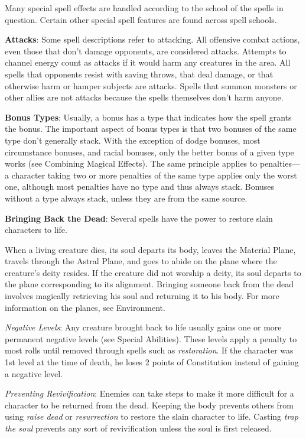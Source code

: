 				
Many special spell effects are handled according to the school of the spells in question. Certain other special spell features are found across spell schools.
				
\textbf{Attacks}: Some spell descriptions refer to attacking. All offensive combat actions, even those that don't damage opponents, are considered attacks. Attempts to channel energy count as attacks if it would harm any creatures in the area. All spells that opponents resist with saving throws, that deal damage, or that otherwise harm or hamper subjects are attacks. Spells that summon monsters or other allies are not attacks because the spells themselves don't harm anyone.
				
\textbf{Bonus Types}: Usually, a bonus has a type that indicates how the spell grants the bonus. The important aspect of bonus types is that two bonuses of the same type don't generally stack. With the exception of dodge bonuses, most circumstance bonuses, and racial bonuses, only the better bonus of a given type works (see Combining Magical Effects). The same principle applies to penalties---a character taking two or more penalties of the same type applies only the worst one, although most penalties have no type and thus always stack. Bonuses without a type always stack, unless they are from the same source.
				
\textbf{Bringing Back the Dead}: Several spells have the power to restore slain characters to life.
				
When a living creature dies, its soul departs its body, leaves the Material Plane, travels through the Astral Plane, and goes to abide on the plane where the creature's deity resides. If the creature did not worship a deity, its soul departs to the plane corresponding to its alignment. Bringing someone back from the dead involves magically retrieving his soul and returning it to his body. For more information on the planes, see Environment.
				
\textit{Negative Levels}: Any creature brought back to life usually gains one or more permanent negative levels (see Special Abilities). These levels apply a penalty to most rolls until removed through spells such as \textit{restoration}. If the character was 1st level at the time of death, he loses 2 points of Constitution instead of gaining a negative level.
				
\textit{Preventing Revivification}: Enemies can take steps to make it more difficult for a character to be returned from the dead. Keeping the body prevents others from using \textit{raise dead }or \textit{resurrection }to restore the slain character to life. Casting \textit{trap the soul }prevents any sort of revivification unless the soul is first released.
				
